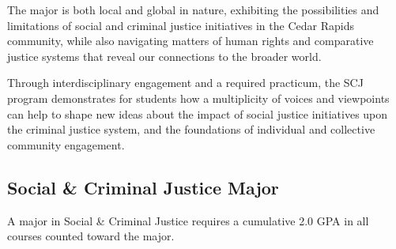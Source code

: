 \documentclass[
  letterpaper,
]{scrbook}
\begin{document}
The major is both local and global in nature, exhibiting the
possibilities and limitations of social and criminal justice initiatives
in the Cedar Rapids community, while also navigating matters of human
rights and comparative justice systems that reveal our connections to
the broader world.

Through interdisciplinary engagement and a required practicum, the SCJ
program demonstrates for students how a multiplicity of voices and
viewpoints can help to shape new ideas about the impact of social
justice initiatives upon the criminal justice system, and the
foundations of individual and collective community engagement.

\hypertarget{social-criminal-justice-major}{%
\subsection{Social \& Criminal Justice
Major}\label{social-criminal-justice-major}}

A major in Social \& Criminal Justice requires a cumulative 2.0 GPA in
all courses counted toward the major.
\end{document}
